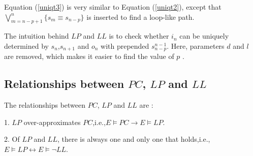 \documentclass[journal]{IEEEtran}
\begin{document}

\begin{equation}\label{uniqt3}
\end{equation}

Equation (\ref{uniqt3}) is very similar to Equation (\ref{uniqt2}),
except that $\bigvee_{m=n-p+1}^{n}\{s_m\equiv s_{n-p}\}$ is inserted to find a loop-like path.

The intuition behind $LP$ and $LL$ is to check
whether $i_n$ can be uniquely determined by $s_n$,$s_{n+1}$ and $o_n$ with prepended $s_{n-p}^{n-1}$.
Here,
parameters $d$ and $l$ are removed,
which makes it easier to find the value of $p$ .



\subsection{Relationships between $PC$, $LP$ and $LL$}\label{subsec_relproof}

The relationships between $PC$, $LP$ and $LL$ are :

1. $LP$ over-approximates $PC$,i.e.,$E\vDash PC\to E\vDash LP$.

2. Of $LP$ and $LL$,
there is always one and only one that holds,i.e.,$E\vDash LP\leftrightarrow E\vDash\neg LL$.
\end{document}
